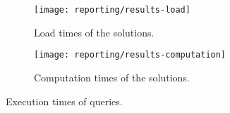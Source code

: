 \begin{figure}[htb]
    \begin{subfigure}[t]{\linewidth}
        \centering
        \texttt{[image: reporting/results-load]}
        \caption{Load times of the solutions.}
        \label{fig:load-times}
    \end{subfigure}
    \begin{subfigure}[t]{\linewidth}
        \centering
        \texttt{[image: reporting/results-computation]}
        \caption{Computation times of the solutions.}
        \label{fig:computation-times}
    \end{subfigure}
    \caption{Execution times of queries.}
    \label{fig:execution-times}
    \vspace{-3ex}
\end{figure}

